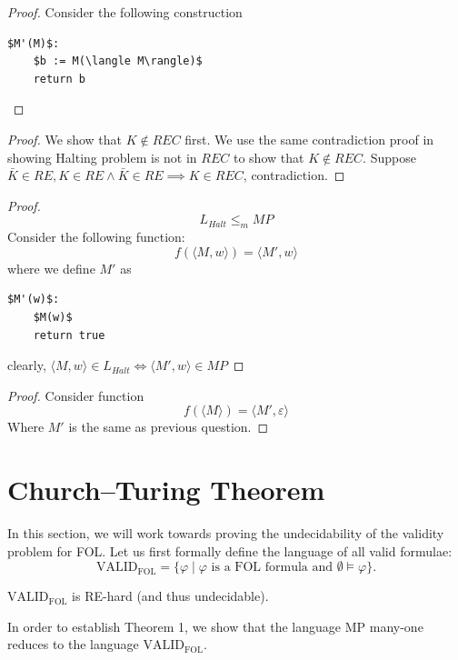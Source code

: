 \documentclass{article}
\newtheorem{theorem}{Theorem}[section]
\let\oldtheorem\theorem
\let\endoldtheorem\endtheorem
\renewenvironment{theorem}
  {\begin{tcolorbox}[
      colback=yellow!6,
      colframe=yellow!60!black,
      boxrule=0.6pt,
      arc=2pt,
      left=6pt,right=6pt,top=4pt,bottom=4pt,
      parbox=false
    ]\oldtheorem}
  {\endoldtheorem\end{tcolorbox}}
\begin{document}
\begin{proof}
    Consider the following construction 
    \begin{lstlisting}[mathescape=true]
$M'(M)$:
    $b := M(\langle M\rangle)$
    return b      
    \end{lstlisting}
\end{proof}

\begin{proof}
    We show that $K \notin REC$ first.
    We use the same contradiction proof in showing Halting problem is not in $REC$ to show that $K \notin REC$. 
    Suppose $\bar{K} \in RE, K \in RE \land \bar{K} \in RE\implies K \in REC$, contradiction.  
\end{proof}


\begin{proof}
    \[L_{Halt} \leq_m MP\]
    Consider the following function: 
    \[f(\langle M, w\rangle) = \langle M', w\rangle\]
    where we define $M'$ as 
    \begin{lstlisting}[mathescape=true]
$M'(w)$:
    $M(w)$
    return true      
    \end{lstlisting}
    clearly, $\langle M, w \rangle \in L_{Halt} \iff \langle M', w \rangle \in MP$
\end{proof}

\begin{proof}
    Consider function
    \[f(\langle M \rangle) = \langle M', \varepsilon \rangle\]
    Where $M'$ is the same as previous question. 
\end{proof}

\section*{Church--Turing Theorem}

In this section, we will work towards proving the undecidability of the validity problem for FOL. Let us first formally define the language of all valid formulae:
\[
\mathrm{VALID}_{\mathrm{FOL}} = \{\varphi \mid \varphi \text{ is a FOL formula and } \emptyset \models \varphi\}.
\]

\begin{theorem}[Church and Turing]
$\mathrm{VALID}_{\mathrm{FOL}}$ is RE-hard (and thus undecidable).
\end{theorem}

In order to establish Theorem 1, we show that the language $\mathrm{MP}$ many-one reduces to the language $\mathrm{VALID}_{\mathrm{FOL}}$.
\end{document}
